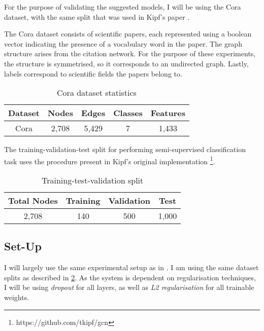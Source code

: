 \documentclass[10pt,a4]{article}
\begin{document}
    For the purpose of validating the suggested models, I will be using the Cora 
    dataset, with the same split that was used in Kipf's paper \cite{kipf2016semi}.
    
    The Cora dataset consists of scientific papers, each represented using a boolean 
    vector indicating the presence of a vocabulary word in the paper. The graph 
    structure arises from the citation network. For the purpose of these experiments, 
    the structure is symmetrised, so it corresponds to an undirected graph. Lastly, labels
    correspond to scientific fields the papers belong to.
    
    \begin{table}
        \centering
        \caption{Cora dataset statistics}
        \label{tab:datastat}
        \begin{tabular}{c c c c c}
            
            \textbf{Dataset} & \textbf{Nodes} & \textbf{Edges} & \textbf{Classes} & \textbf{Features} \\
            \hline
            Cora    & 2,708 & 5,429 & 7       & 1,433    \\ 
        \end{tabular}
    \end{table}
    
    The training-validation-test split for performing semi-supervised classification 
    task uses the procedure present in Kipf's original implementation 
    \footnote{https://github.com/tkipf/gcn}. 

    \begin{table}[!h]
        \centering
        \caption{Training-test-validation split}
        \label{tab:traintest}
        \begin{tabular}{c c c c}
            
            \textbf{Total Nodes} & \textbf{Training} & \textbf{Validation} & \textbf{Test} \\
            \hline
            2,708 & 140 & 500 & 1,000    \\ 
        \end{tabular}
    \end{table}
    
    \subsection{Set-Up}

    I will largely use the same experimental setup as in \cite{kipf2016semi}. I am 
    using the same dataset splits as described in \ref{tab:traintest}. As the 
    system is dependent on regularisation techniques, I will be using 
    \emph{dropout} for all layers, as well as \emph{L2 regularisation} for 
    all trainable weights. 
\end{document}
